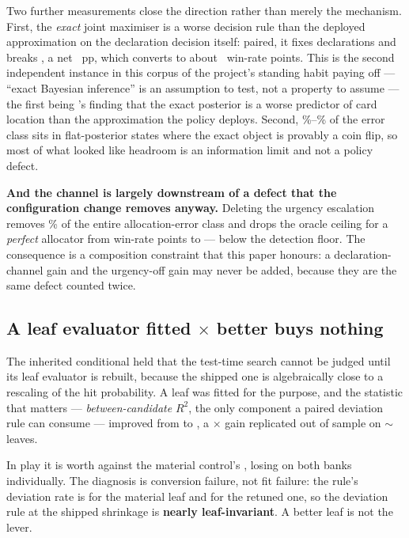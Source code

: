 Two further measurements close the direction rather than merely the mechanism. First, the
\emph{exact} joint maximiser is a worse decision rule than the deployed approximation on the
declaration decision itself: paired, it fixes \vsevenJointFixed{} declarations and breaks \vsevenJointBroken{}, a net
\vsevenJointWorseNet{}~pp, which converts to about \vsevenJointWorseWin{}~win-rate points. This is the
second independent instance in this corpus of the project's standing habit paying off --- ``exact
Bayesian inference'' is an assumption to test, not a property to assume --- the first being \vsix{}'s
finding that the exact posterior is a worse predictor of card location than the approximation the
policy deploys. Second, \vsevenJointFlatLo\%--\vsevenJointFlatHi\% of the error class sits in
flat-posterior states where the exact object is provably a coin flip, so most of what looked like
headroom is an information limit and not a policy defect.

\textbf{And the channel is largely downstream of a defect that the configuration change removes
anyway.} Deleting the urgency escalation removes \vsevenLoneUrgencyShare\% of the entire
allocation-error class and drops the oracle ceiling for a \emph{perfect} allocator from
\vsevenLoneCeilingBefore{} win-rate points to \vsevenLoneCeilingAfter{} --- below the detection floor.
The consequence is a composition constraint that this paper honours: a declaration-channel gain and
the urgency-off gain may never be added, because they are the same defect counted twice.

\subsection{A leaf evaluator fitted \vsevenKoneFold$\times$ better buys nothing}
\label{sec:rejected-leaf}

The inherited conditional held that the test-time search cannot be judged until its leaf evaluator is
rebuilt, because the shipped one is algebraically close to a rescaling of the hit probability. A leaf
was fitted for the purpose, and the statistic that matters --- \emph{between-candidate} $R^2$, the
only component a paired deviation rule can consume --- improved from \vsevenKoneRsqBefore{} to
\vsevenKoneRsqAfter{}, a \vsevenKoneFold$\times$ gain replicated out of sample on $\sim$\vsevenKoneLeaves{} leaves.

In play it is worth \vsevenKoneInPlay{} against the material control's \vsevenKoneControl{}, losing on
both banks individually. The diagnosis is conversion failure, not fit failure: the rule's deviation
rate is \vsevenKoneChangeLo{} for the material leaf and \vsevenKoneChangeHi{} for the retuned one, so
the deviation rule at the shipped shrinkage is \textbf{nearly leaf-invariant}. A better leaf is not
the lever.

